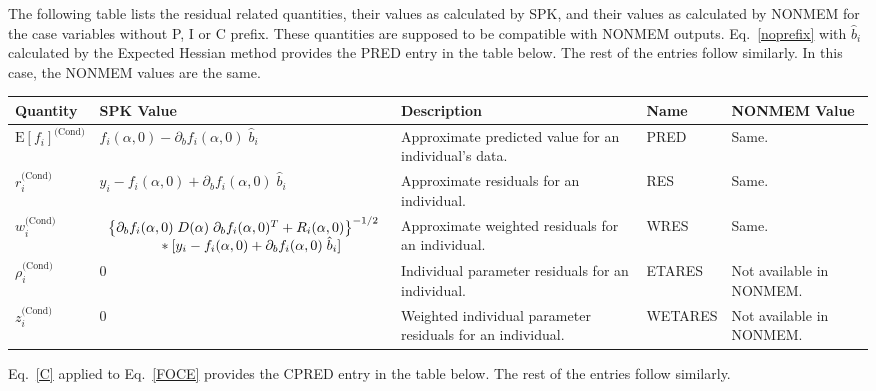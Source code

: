 \documentclass{article}
\begin{document}
The following table lists the residual related quantities, their
values as calculated by SPK, and their values as calculated by NONMEM for the 
case variables without P, I or C prefix. These quantities are supposed to be
compatible with NONMEM outputs.
Eq.~\ref{noprefix} with $\hat{b}_i$ calculated by the Expected Hessian
method provides the PRED entry in the table
below. The rest of the entries follow similarly.
In this case, the NONMEM values are the same.

\begin{center}
\begin{tabular}{|p{0.75in}|p{3.25in}|p{1.1in}|p{0.85in}|p{1.0in}|}
\hline
\hline
  {\bf Quantity}
    & {\bf SPK Value}
    & {\bf Description}
    & {\bf Name}
    & {\bf NONMEM Value} \\
  \hline
  \hline
  $\mbox{E} \left[ f_i \right]^{\mbox{(Cond)}}$
    & $f_i(\alpha, 0) - \partial_b f_i(\alpha, 0) \; \hat{b}_i$
    & Approximate predicted value for an individual's data.
    & PRED 
    & Same.\\
  \hline
  $r^{\mbox{(Cond)}}_i$
    & $y_i - f_i(\alpha, 0) + \partial_b f_i(\alpha, 0) \; \hat{b}_i$
    & Approximate residuals for an individual.
    & RES 
    & Same.\\
  \hline
  $w^{\mbox{(Cond)}}_i$
    & $\begin{array}{l}
        \left\{ \partial_b f_i(\alpha, 0) \;
          D(\alpha) \; \partial_b f_i(\alpha, 0)^T
          + R_i(\alpha, 0) \right\}^{-1/2} \\
        \mbox{\hspace{0.5in}}
        \ast [ y_i - f_i(\alpha, 0) 
           + \partial_b f_i(\alpha, 0) \; \hat{b}_i ]
      \end{array} $
    & Approximate weighted residuals for an individual.
    & WRES 
    & Same.\\
  \hline
  $\rho^{\mbox{(Cond)}}_i$
    & 0
    & Individual parameter residuals for an individual.
    & ETARES
    & Not available in NONMEM. \\
  \hline
  $z^{\mbox{(Cond)}}_i$
    & 0
    & Weighted individual parameter residuals for an individual.
    & WETARES
    & Not available in NONMEM. \\
  \hline
  \hline
\end{tabular}
\end{center}

Eq.~\ref{C} applied to Eq.~\ref{FOCE} provides the CPRED entry in the table
below. The rest of the entries follow similarly.
\end{document}
